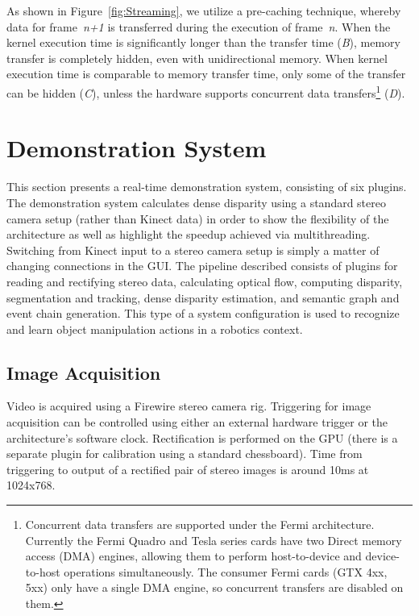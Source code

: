As shown in Figure~\ref{fig:Streaming}, we utilize a pre-caching technique, whereby data for frame~\emph{n+1} is transferred during the execution of frame~\emph{n}. When the kernel execution time is significantly longer than the transfer time (\emph{B}), memory transfer is completely hidden, even with unidirectional memory. When kernel execution time is comparable to memory transfer time, only some of the transfer can be hidden (\emph{C}), unless the hardware supports concurrent data transfers\footnote{Concurrent data transfers are supported under the Fermi architecture. Currently the Fermi Quadro and Tesla series cards have two Direct memory access (DMA) engines, allowing them to perform host-to-device and device-to-host operations simultaneously. The consumer Fermi cards (GTX 4xx, 5xx) only have a single DMA engine, so concurrent transfers are disabled on them.}  (\emph{D}).



\section{Demonstration System}
This section presents a real-time demonstration system, consisting of six plugins. The demonstration system calculates dense disparity using a standard stereo camera setup (rather than Kinect data) in order to show the flexibility of the architecture as well as highlight the speedup achieved via multithreading. Switching from Kinect input to a stereo camera setup is simply a matter of changing connections in the GUI. The pipeline described consists of plugins for reading  and rectifying stereo data, calculating optical flow\cite{PauwelsArchitecture}, computing disparity\cite{PauwelsArchitecture}, segmentation and tracking\cite{Abramov_3DSegmentation}, dense disparity estimation, and semantic graph and event chain generation\cite{Aksoy2010,Aksoy2011}. This type of a system configuration is used to recognize and learn object manipulation actions in a robotics context.

\subsection{Image Acquisition}
Video is acquired using a Firewire stereo camera rig. Triggering for image acquisition can be controlled using either an external hardware trigger or the architecture's software clock. Rectification is performed on the GPU (there is a separate plugin for calibration using a standard chessboard). Time from triggering to output of a rectified pair of stereo images is around 10ms at 1024x768.

